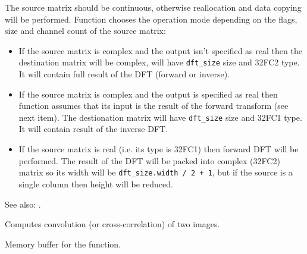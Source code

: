 The source matrix should be continuous, otherwise reallocation and data copying will be performed. Function chooses the operation mode depending on the flags, size and channel count of the source matrix:
\begin{itemize}
  \item If the source matrix is complex and the output isn't specified as real then the destination matrix will be complex, will have \texttt{dft\_size} size and 32FC2 type. It will contain full result of the DFT (forward or inverse).
  \item If the source matrix is complex and the output is specified as real then function assumes that its input is the result of the forward transform (see next item). The destionation matrix will have \texttt{dft\_size} size and 32FC1 type. It will contain result of the inverse DFT.
  \item If the source matrix is real (i.e. its type is 32FC1) then forward DFT will be performed. The result of the DFT will be packed into complex (32FC2) matrix so its width will be \texttt{dft\_size.width / 2 + 1}, but if the source is a single column then height will be reduced.
\end{itemize}

See also: .


Computes convolution (or cross-correlation) of two images.


\begin{description}
\end{description}


Memory buffer for the  function.

